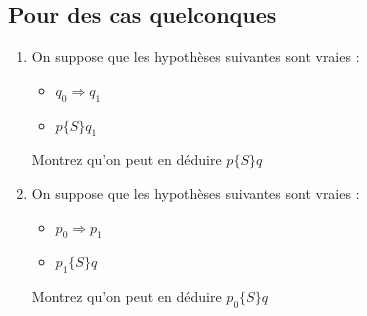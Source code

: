 \documentclass[a4paper,11pt]{article}
\begin{document}
\subsection{Pour des cas quelconques}

\begin{enumerate}
\item On suppose que les hypothèses suivantes sont vraies :
\begin{itemize}
\item $q_0 \Rightarrow q_1$
\item $p\{S\}q_1$
\end{itemize}

Montrez qu'on peut en déduire $p\{S\}q$

\item On suppose que les hypothèses suivantes sont vraies :
\begin{itemize}
\item $p_0 \Rightarrow p_1$
\item $p_1\{S\}q$
\end{itemize}

Montrez qu'on peut en déduire $p_0\{S\}q$
\end{enumerate}
\end{document}
